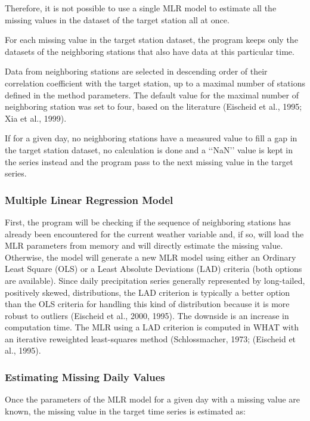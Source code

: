 \documentclass[TechnicalNoteMeteo.tex]{subfiles}
\begin{document}
Therefore, it is not possible to use a single MLR model to estimate all the missing values in the dataset of the target station all at once. 

For each missing value in the target station dataset, the program keeps only the datasets of the neighboring stations that also have data at this particular time. 

Data from neighboring stations are selected in descending order of their correlation coefficient with the target station, up to a maximal number of stations defined in the method parameters. The default value for the maximal number of neighboring station was set to four, based on the literature (Eischeid et al., 1995; Xia et al., 1999).

If for a given day, no neighboring stations have a measured value to fill a gap in the target station dataset, no calculation is done and a ‘‘NaN’’ value is kept in the series instead and the program pass to the next missing value in the target series.

\subsubsection{Multiple Linear Regression Model}
First, the program will be checking if the sequence of neighboring stations has already been encountered for the current weather variable and, if so, will load the MLR parameters from memory and will directly estimate the missing value. Otherwise, the model will generate a new MLR model using either an Ordinary Least Square (OLS) or a Least Absolute Deviations (LAD) criteria (both options are available). Since daily precipitation series generally represented by long-tailed, positively skewed, distributions, the LAD criterion is typically a better option than the OLS criteria for handling this kind of distribution because it is more robust to outliers (Eischeid et al., 2000, 1995). The downside is an increase in computation time. The MLR using a LAD criterion is computed in WHAT with an iterative reweighted least-squares method (Schlossmacher, 1973; (Eischeid et al., 1995).


\subsubsection{Estimating Missing Daily Values}

Once the parameters of the MLR model for a given day with a missing value are known, the missing value in the target time series is estimated as:
\end{document}
